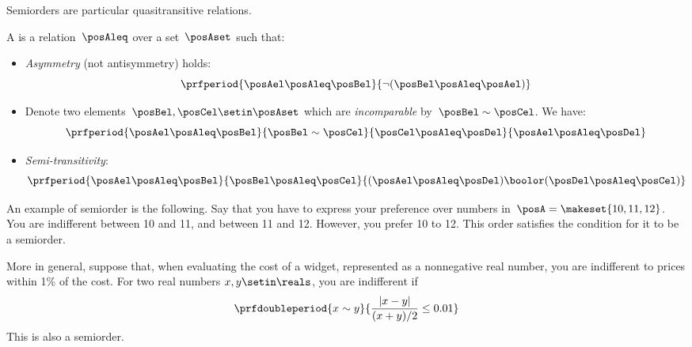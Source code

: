 Semiorders are particular quasitransitive relations.
\begin{definition}[Semiorder]\label{def:semiorder}
    A  is a relation~$\posAleq$ over a set~$\posAset$ such that:
    \begin{itemize}
        \item \emph{Asymmetry} (not antisymmetry) holds:
              \begin{equation}\label{eq:semiorder-asym}
                  \prfperiod{
                      \posAel \posAleq \posBel
                  }{
                      \neg(\posBel \posAleq \posAel)
                  }
              \end{equation}
        \item Denote two elements~$\posBel, \posCel \setin \posAset$ which are \emph{incomparable} by~$\posBel \sim \posCel$.
              We have:
              \begin{equation}\label{eq:el-incomparable}
                  \prfperiod{
                      \posAel \posAleq \posBel
                  }{
                      \posBel \sim \posCel
                  }{
                      \posCel \posAleq \posDel
                  }{
                      \posAel \posAleq \posDel
                  }
              \end{equation}
        \item \emph{Semi-transitivity}:
              \begin{equation}\label{eq:semiorder-2}
                  \prfperiod{
                      \posAel \posAleq \posBel
                  }{
                      \posBel \posAleq \posCel
                  }{
                      (\posAel \posAleq \posDel) \boolor (\posDel \posAleq \posCel)
                  }
              \end{equation}
    \end{itemize}

\end{definition}
\begin{example}
    An example of semiorder is the following.
    Say that you have to express your preference over numbers in~$\posA=\makeset{10,11,12}$.
    You are indifferent between 10 and 11, and between 11 and 12.
    However, you prefer 10 to 12.
    This order satisfies the condition for it to be a semiorder.

    More in general, suppose that, when evaluating the cost of a widget, represented as a nonnegative real number, you are indifferent to prices within 1\% of the cost.
    For two real numbers $x,y\setin\reals$, you are indifferent if
    \begin{equation}\label{eq:semiorder-tolerances}
        \prfdoubleperiod{
            x \sim y
        }{
            \frac{| x - y |}{ (x+y)/2} \leq 0.01
        }
    \end{equation}
    This is also a semiorder.
\end{example}

